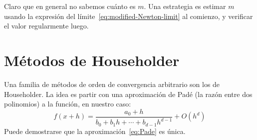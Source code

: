   Claro que en general no sabemos cuánto es \(m\).
  Una estrategia es estimar \(m\)
  usando la expresión del límite~\eqref{eq:modified-Newton-limit}
  al comienzo,
  y verificar el valor regularmente luego.

\section{Métodos de Householder}
\label{sec:metod-de-householder}

  Una familia de métodos de orden de convergencia arbitrario
  son los de Householder\cite{householder70:_num_single_nonlin_equation}.
  La idea es partir con una aproximación de Padé
  (la razón entre dos polinomios)
  a la función,
  en nuestro caso:
  \begin{equation}
    \label{eq:Pade}
    f(x + h)
      = \frac{a_0 + h}{b_0 + b_1 h + \dotsb + b_{d - 1} h^{d - 1}}
          + O(h^d)
  \end{equation}
  Puede demostrarse que la aproximación~\eqref{eq:Pade} es única.

